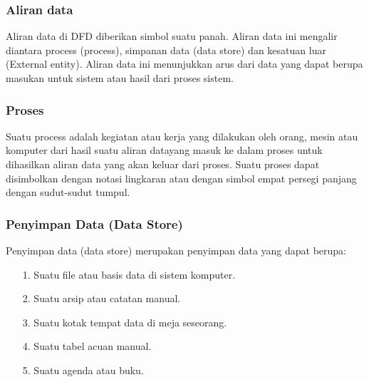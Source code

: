 \documentclass{jtetiproposalskripsi}
\begin{document}
\subsubsection{Aliran data}
Aliran data di DFD diberikan simbol suatu panah. Aliran data ini mengalir diantara process (process), simpanan data (data store) dan kesatuan luar (External entity). Aliran data ini menunjukkan arus dari data yang dapat berupa masukan untuk sistem atau hasil dari proses sistem.
\subsubsection{Proses}
Suatu process adalah kegiatan atau kerja yang dilakukan oleh orang, mesin atau komputer dari hasil suatu aliran datayang masuk ke dalam proses untuk dihasilkan aliran data yang akan keluar dari proses. Suatu proses dapat disimbolkan dengan notasi lingkaran atau dengan simbol empat persegi panjang dengan sudut-sudut tumpul.
\subsubsection{Penyimpan Data (Data Store)}
Penyimpan data (data store) merupakan penyimpan data yang dapat berupa:
\begin{itemize}
\item[1.] Suatu file atau basis data di sistem komputer.
\item[2.] Suatu arsip atau catatan manual.
\item[3.] Suatu kotak tempat data di meja seseorang.
\item[4.] Suatu tabel acuan manual.
\item[5.] Suatu agenda atau buku.
\end{itemize}
\end{document}
